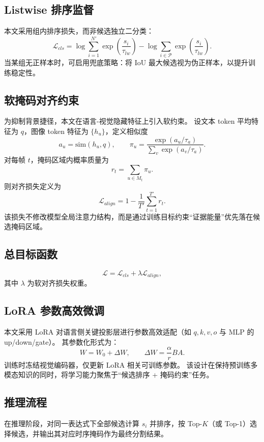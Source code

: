 \subsection{Listwise 排序监督}
本文采用组内排序损失，而非候选独立二分类：
\[
\mathcal{L}_{cls}
=
\log\sum_{i=1}^{N'}\exp\left(\frac{s_i}{\tau_{lw}}\right)
-
\log\sum_{i\in\mathcal{P}}\exp\left(\frac{s_i}{\tau_{lw}}\right).
\]
当某组无正样本时，可启用兜底策略：将 IoU 最大候选视为伪正样本，以提升训练稳定性。

\subsection{软掩码对齐约束}
为抑制背景捷径，本文在语言-视觉隐藏特征上引入软约束。
设文本 token 平均特征为 $q$，图像 token 特征为 $\{h_u\}$，定义相似度
\[
a_u=\mathrm{sim}(h_u,q),
\qquad
\pi_u=\frac{\exp(a_u/\tau_a)}{\sum_v \exp(a_v/\tau_a)}.
\]
对每帧 $t$，掩码区域内概率质量为
\[
r_t=\sum_{u\in M_t}\pi_u.
\]
则对齐损失定义为
\[
\mathcal{L}_{align}=1-\frac{1}{T'}\sum_{t=1}^{T'}r_t.
\]
该损失不修改模型全局注意力结构，而是通过训练目标约束“证据能量”优先落在候选掩码区域。

\subsection{总目标函数}
\[
\mathcal{L}=\mathcal{L}_{cls}+\lambda\mathcal{L}_{align},
\]
其中 $\lambda$ 为软对齐损失权重。

\subsection{LoRA 参数高效微调}
本文采用 LoRA 对语言侧关键投影层进行参数高效适配（如 $q,k,v,o$ 与 MLP 的 up/down/gate）。
其参数化形式为：
\[
W=W_0+\Delta W,
\qquad
\Delta W=\frac{\alpha}{r}BA.
\]
训练时冻结视觉编码器，仅更新 LoRA 相关可训练参数。
该设计在保持预训练多模态知识的同时，将学习能力聚焦于“候选排序 + 掩码约束”任务。

\subsection{推理流程}
在推理阶段，对同一表达式下全部候选计算 $s_i$ 并排序，按 Top-$K$（或 Top-1）选择候选，并输出其对应时序掩码作为最终分割结果。
